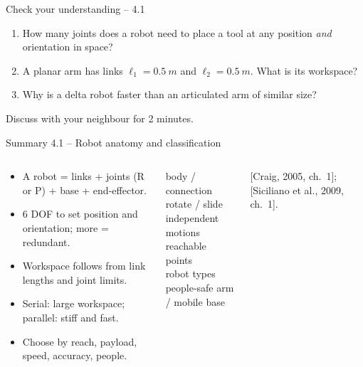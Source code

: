 \documentclass[aspectratio=169,10pt]{beamer}
\begin{document}
\begin{frame}[t]{Check your understanding -- 4.1}
\vspace{4mm}
\begin{keybox}
\large
\begin{enumerate}
\item How many joints does a robot need to place a tool at any position \emph{and} orientation in space?\\[2mm]
\item A planar arm has links $\ell_1=\SI{0.5}{m}$ and $\ell_2=\SI{0.5}{m}$. What is its workspace?\\[2mm]
\item Why is a delta robot faster than an articulated arm of similar size?
\end{enumerate}
\end{keybox}
\vfill
\centering\small\color{mkGray} Discuss with your neighbour for 2 minutes.
\end{frame}

\begin{frame}[t]{Summary 4.1 -- Robot anatomy and classification}
\begin{columns}[T,onlytextwidth]
\begin{keybox}
\small
\begin{itemize}
\item A robot = links + joints (R or P) + base + end-effector.
\item 6 DOF to set position and orientation; more = redundant.
\item Workspace follows from link lengths and joint limits.
\item Serial: large workspace; parallel: stiff and fast.
\item Choose by reach, payload, speed, accuracy, people.
\end{itemize}
\end{keybox}
\begin{defbox}
\small
{} body / connection\\
 rotate / slide\\
 independent motions\\
 reachable points\\
 robot types\\
 people-safe arm / mobile base
\end{defbox}
{\scriptsize\color{mkGray} [Craig, 2005, ch.~1]; [Siciliano et al., 2009, ch.~1].}
\end{columns}
\end{frame}
\end{document}

